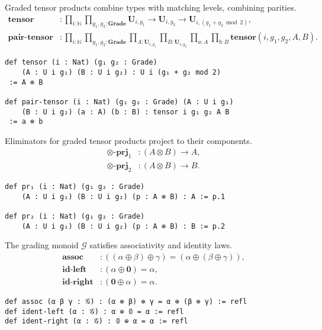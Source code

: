 \documentclass{article}
\begin{document}
\begin{definition}
Graded tensor products combine types with matching levels, combining parities.
\[
\begin{aligned}
\mathbf{tensor} & : \prod_{i : \mathbb{N}} \prod_{g_1, g_2 : \mathbf{Grade}}
\mathbf{U}_{i,g_1} \to \mathbf{U}_{i,g_2} \to \mathbf{U}_{i,(g_1 + g_2 \bmod 2)}, \\
\mathbf{pair\text{-}tensor} & : \prod_{i : \mathbb{N}} \prod_{g_1, g_2 : \mathbf{Grade}}
\prod_{A : \mathbf{U}_{i,g_1}} \prod_{B : \mathbf{U}_{i,g_2}} \prod_{a : A} \prod_{b : B}
\mathbf{tensor}(i, g_1, g_2, A, B).
\end{aligned}
\]
\begin{lstlisting}[mathescape=true]
def tensor (i : Nat) (g₁ g₂ : Grade)
    (A : U i g₁) (B : U i g₂) : U i (g₁ + g₂ mod 2)
 := A ⊗ B

def pair-tensor (i : Nat) (g₁ g₂ : Grade) (A : U i g₁)
    (B : U i g₂) (a : A) (b : B) : tensor i g₁ g₂ A B
 := a ⊗ b
\end{lstlisting}
\end{definition}

\begin{definition}
Eliminators for graded tensor products project to their components.
\[
\begin{aligned}
\otimes\text{-}\mathbf{prj}_1 & : (A \otimes B) \to A, \\
\otimes\text{-}\mathbf{prj}_2 & : (A \otimes B) \to B.
\end{aligned}
\]
\begin{lstlisting}[mathescape=true]
def pr₁ (i : Nat) (g₁ g₂ : Grade)
    (A : U i g₁) (B : U i g₂) (p : A ⊗ B) : A := p.1

def pr₂ (i : Nat) (g₁ g₂ : Grade)
    (A : U i g₁) (B : U i g₂) (p : A ⊗ B) : B := p.2
\end{lstlisting}
\end{definition}

\begin{theorem}
The grading monoid $\mathcal{G}$ satisfies associativity and identity laws.
\[
\begin{aligned}
\mathbf{assoc} & : ((\alpha \oplus \beta) \oplus \gamma) = (\alpha \oplus (\beta \oplus \gamma)), \\
\mathbf{id\text{-}left} & : (\alpha \oplus \mathbf{0}) = \alpha, \\
\mathbf{id\text{-}right} & : (\mathbf{0} \oplus \alpha) = \alpha.
\end{aligned}
\]
\begin{lstlisting}[mathescape=true]
def assoc (α β γ : 𝒢) : (α ⊕ β) ⊕ γ = α ⊕ (β ⊕ γ) := refl
def ident-left (α : 𝒢) : α ⊕ 𝟘 = α := refl
def ident-right (α : 𝒢) : 𝟘 ⊕ α = α := refl
\end{lstlisting}
\end{theorem}
\end{document}
